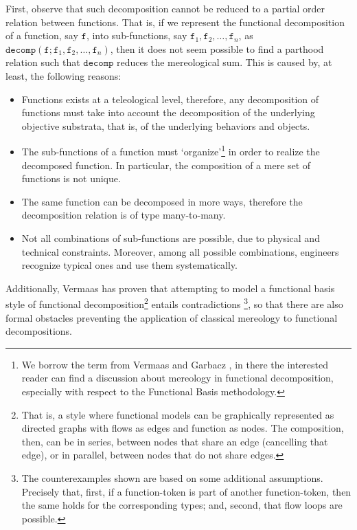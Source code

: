 \documentclass[sw]{iosart2x}
\newcommand{\generalStyle}[1]{\texttt{#1}}
\newcommand{\cst}[1]{\ensuremath{\mathtt{#1}}}
\newcommand{\decom}{\generalStyle{decomp}}
\newcommand{\TODO}[1]{{\color{red} #1}}
\begin{document}
First, observe that such decomposition cannot be reduced to a partial order relation between functions. %
That is, if we represent the functional decomposition of a function, say $\cst{f}$, into sub-functions, say $\cst{f}_1, \cst{f}_2, \dots, \cst{f}_n$, as $\decom(\cst{f};\cst{f}_1,\cst{f}_2,\dots,\cst{f}_n)$, then it does not seem possible to find a parthood relation such that $\decom$ reduces the mereological sum.
This is caused by, at least, the following reasons:
\begin{itemize}
  \item Functions exists at a teleological level, therefore, any decomposition of functions must take into account the decomposition of the underlying objective substrata, that is, of the underlying behaviors and objects.
  \item The sub-functions of a function must `organize'\footnote{We borrow the term from Vermaas and Garbacz \cite{vermaasFunctionalDecompositionMereology2009a}, in there the interested reader can find a discussion about mereology in functional decomposition, especially with respect to the Functional Basis methodology.} in order to realize the decomposed function. In particular, the composition of a mere set of functions is not unique.
  \item The same function can be decomposed in more ways, therefore the decomposition relation is of type many-to-many.
  \item Not all combinations of sub-functions are possible, due to physical and technical constraints. 
  Moreover, among all possible combinations, engineers recognize typical ones and use them systematically. 
\end{itemize}
Additionally, Vermaas has proven that attempting to model a functional basis style of functional decomposition\footnote{That is, a style where functional models can be graphically represented as directed graphs with flows as edges and function as nodes. The composition, then, can be in series, between nodes that share an edge (cancelling that edge), or in parallel, between nodes that do not share edges.} entails contradictions \cite{vermaasFormalImpossibilityAnalysing2013}\footnote{The counterexamples shown are based on some additional assumptions. Precisely that, first, if a function-token is part of another function-token, then the same holds for the corresponding types; and, second, that flow loops are possible. %
}, so that there are also formal obstacles preventing the application of classical mereology to functional decompositions.
\end{document}

